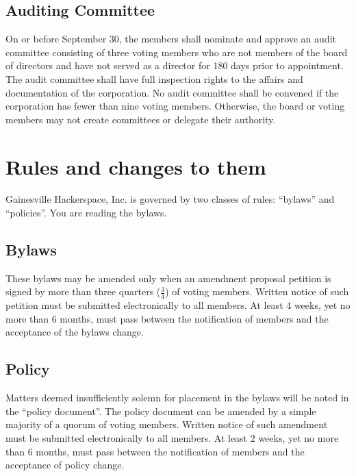 \documentclass[10pt,letterpaper,titlepage]{article}
\newcommand\corpname{Gainesville Hackerspace, Inc.}
\begin{document}
\subsection{Auditing Committee}

On or before September 30, the members shall nominate and approve an audit
committee consisting of three voting members who are not members of the board
of directors and have not served as a director for 180 days prior to
appointment.
The audit committee shall have full inspection rights to the affairs and
documentation of the corporation.
No audit committee shall be convened if the corporation has fewer than nine
voting members.
Otherwise, the board or voting members may not create committees or delegate
their authority.

\section{Rules and changes to them}
\label{rules}

\corpname{} is governed by two classes of rules: ``bylaws'' and
``policies''.  You are reading the bylaws.

\subsection{Bylaws}

These bylaws may be amended only when an amendment proposal petition
is signed by more than three quarters ($\frac{3}{4}$) of voting
members.  Written notice of such petition must be submitted
electronically to all members.  At least 4 weeks, yet no more than 6
months, must pass between the notification of members and the
acceptance of the bylaws change.

\subsection{Policy}

Matters deemed insufficiently solemn for placement in the bylaws will
be noted in the ``policy document''.  The policy document can be
amended by a simple majority of a quorum of voting members.  Written
notice of such amendment must be submitted electronically to all
members.  At least 2 weeks, yet no more than 6 months, must pass
between the notification of members and the acceptance of policy
change.
\end{document}
